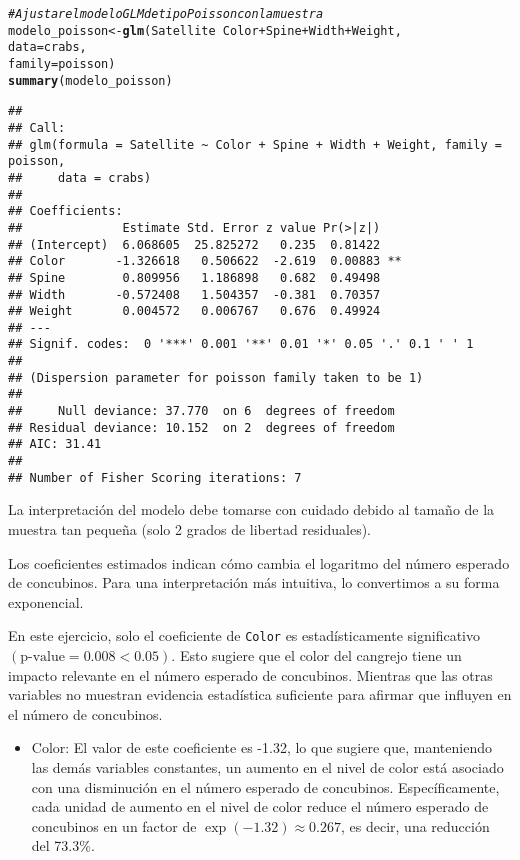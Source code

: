 \documentclass[paper=letter, fontsize=11pt]{scrartcl}\usepackage[]{graphicx}\usepackage[]{xcolor}
\makeatletter
\newcommand{\hlcom}[1]{\textcolor[rgb]{0.678,0.584,0.686}{\textit{#1}}}%
\newcommand{\hlopt}[1]{\textcolor[rgb]{0,0,0}{#1}}%
\newcommand{\hldef}[1]{\textcolor[rgb]{0.345,0.345,0.345}{#1}}%
\newcommand{\hlkwb}[1]{\textcolor[rgb]{0.69,0.353,0.396}{#1}}%
\newcommand{\hlkwc}[1]{\textcolor[rgb]{0.333,0.667,0.333}{#1}}%
\newcommand{\hlkwd}[1]{\textcolor[rgb]{0.737,0.353,0.396}{\textbf{#1}}}%
\newenvironment{kframe}{%
 \def\at@end@of@kframe{}%
 \ifinner\ifhmode%
  \def\at@end@of@kframe{\end{minipage}}%
  \begin{minipage}{\columnwidth}%
 \fi\fi%
 \def\FrameCommand##1{\hskip\@totalleftmargin \hskip-\fboxsep
 \colorbox{shadecolor}{##1}\hskip-\fboxsep
     \hskip-\linewidth \hskip-\@totalleftmargin \hskip\columnwidth}%
 \MakeFramed {\advance\hsize-\width
   \@totalleftmargin\z@ \linewidth\hsize
   \@setminipage}}%
 {\par\unskip\endMakeFramed%
 \at@end@of@kframe}
\newenvironment{knitrout}{}{} %
\numberwithin{equation}{problemcounter} %
\numberwithin{figure}{problemcounter} %
\numberwithin{table}{problemcounter} %
\numberwithin{subsection}{problemcounter}
\makeatother
\begin{document}
\begin{knitrout}
\color{fgcolor}\begin{kframe}
\begin{alltt}
\hlcom{# Ajustar el modelo GLM de tipo Poisson con la muestra}
\hldef{modelo_poisson} \hlkwb{<-} \hlkwd{glm}\hldef{(Satellite} \hlopt{~} \hldef{Color} \hlopt{+} \hldef{Spine} \hlopt{+} \hldef{Width} \hlopt{+} \hldef{Weight,}
                             \hlkwc{data} \hldef{= crabs,}
                             \hlkwc{family} \hldef{= poisson)}
\hlkwd{summary}\hldef{(modelo_poisson)}
\end{alltt}
\begin{verbatim}
## 
## Call:
## glm(formula = Satellite ~ Color + Spine + Width + Weight, family = poisson, 
##     data = crabs)
## 
## Coefficients:
##              Estimate Std. Error z value Pr(>|z|)   
## (Intercept)  6.068605  25.825272   0.235  0.81422   
## Color       -1.326618   0.506622  -2.619  0.00883 **
## Spine        0.809956   1.186898   0.682  0.49498   
## Width       -0.572408   1.504357  -0.381  0.70357   
## Weight       0.004572   0.006767   0.676  0.49924   
## ---
## Signif. codes:  0 '***' 0.001 '**' 0.01 '*' 0.05 '.' 0.1 ' ' 1
## 
## (Dispersion parameter for poisson family taken to be 1)
## 
##     Null deviance: 37.770  on 6  degrees of freedom
## Residual deviance: 10.152  on 2  degrees of freedom
## AIC: 31.41
## 
## Number of Fisher Scoring iterations: 7
\end{verbatim}
\end{kframe}
\end{knitrout}

La interpretación del modelo debe tomarse con cuidado debido al tamaño de la muestra tan pequeña (solo 2 grados de libertad residuales).

Los coeficientes estimados indican cómo cambia el logaritmo del número esperado de concubinos. Para una interpretación más intuitiva, lo convertimos a su forma exponencial.

En este ejercicio, solo el coeficiente de \texttt{Color} es estadísticamente significativo $(\text{p-value} = 0.008 < 0.05)$. Esto sugiere que el color del cangrejo tiene un impacto relevante en el número esperado de concubinos. Mientras que las otras variables no muestran evidencia estadística suficiente para afirmar que influyen en el número de concubinos.

\begin{itemize}
    \item Color: El valor de este coeficiente es -1.32, lo que sugiere que, manteniendo las demás variables constantes, un aumento en el nivel de color está asociado con una disminución en el número esperado de concubinos. Específicamente, cada unidad de aumento en el nivel de color reduce el número esperado de concubinos en un factor de $\exp(-1.32) \approx 0.267$, es decir, una reducción del 73.3\%.
\end{itemize}
\end{document}
